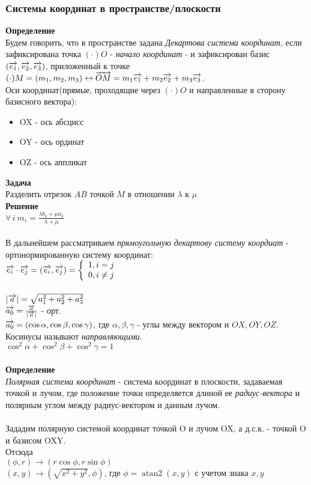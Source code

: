 \documentclass[12pt]{article}
\begin{document}
\subsubsection{Системы координат в пространстве/плоскости}
\textbf{Определение}\\
Будем говорить, что в пространстве задана \textit{Декартова система координат}, если зафиксирована точка $(\cdot)O$ - \textit{начало координат} - и зафиксирован базис $(\overrightarrow{e_1}, \overrightarrow{e_2}, \overrightarrow{e_3})$, приложенный к точке\\
$(\cdot) M = (m_1,m_2,m_3) \leftrightarrow \overrightarrow{OM} = m_1\overrightarrow{e_1}+m_2\overrightarrow{e_2}+m_3\overrightarrow{e_3}$.\\
Оси координат(прямые, проходящие через $(\cdot)O$ и направленные в сторону базисного вектора):
\begin{itemize}
    \item OX - ось абсцисс
    \item OY - ось ординат
    \item OZ - ось аппликат
\end{itemize}
\textbf{Задача}\\
Разделить отрезок $AB$ точкой $M$ в отношении $\lambda$ к $\mu$\\
\textbf{Решение}\\
$\forall\, i\ m_i=\frac{\lambda b_k+\mu a_k}{\lambda+\mu}$\\\\
В дальнейшем рассматриваем \textit{прямоугольную декартову систему коордиат} - ортонормированную систему координат:\\
$\overrightarrow{e_i}\cdot\overrightarrow{e_j} = (\overrightarrow{e_i}, \overrightarrow{e_j}) = \left\{\begin{array}{l}
     1, i = j \\
     0, i \neq j
\end{array}\right.$  \\\\
$|\overrightarrow{a}| = \sqrt{a_1^2+a_2^2+a_3^2}$\\
$\overrightarrow{a_0} = \frac{\overrightarrow{a}}{|\overrightarrow{a}|}$ - орт.\\
$\overrightarrow{a_0} = (\cos \alpha, \cos \beta, \cos \gamma)$, где $\alpha, \beta, \gamma$ - углы между вектором и $OX, OY, OZ$. Косинусы называют \textit{направляющими}.\\
$\cos^2 \alpha+\cos^2 \beta+\cos^2 \gamma = 1$\\\\
\textbf{Определение}\\
\textit{Полярная система координат} - система координат в плоскости, задаваемая точкой и лучом, где положение точки определяется длиной ее \textit{радиус-вектора} и полярным углом между радиус-вектором и данным лучом.\\\\
Зададим полярную системой координат точкой O и лучом OX, а д.с.к. - точкой O и базисом OXY.\\
Отсюда\\
$(\phi, r) \rightarrow (r\cos \phi, r\sin \phi)$\\
$(x,y) \rightarrow (\sqrt{x^2+y^2}, \phi)$, где $\phi = \operatorname{atan2}(x,y)$ с учетом знака $x,y$\\\\
\end{document}
